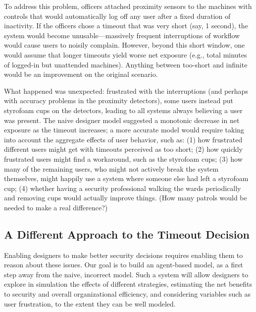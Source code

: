 \documentclass{acm_proc_article-sp}
\newcommand{\ignore}[1] {}
\begin{document}
\ignore{To address this problem, the officers attached proximity sensors to the machines and added controls that,
when detecting that a computer had been left unattended but logged-in for a predetermined, fixed, period of time, the user would be automatically logged off.}
To address this problem, officers attached proximity sensors to the machines 
with controls that would automatically log off any user after a fixed 
duration of inactivity.
If the officers chose a timeout that was very short (say, 1 second),
the system would become unusable---massively frequent interruptions of workflow would cause users to noisily complain.  
However, beyond this short window, one would assume that longer timeouts
yield worse net exposure (e.g., total minutes of logged-in but unattended machines).   Anything between too-short and infinite would be an improvement 
on the original scenario.

What happened was unexpected: frustrated with the interruptions (and
perhaps with accuracy problems in the proximity detectors), some users
instead put styrofoam cups on the detectors, leading to all systems
always believing a user was present.  The naive designer model
suggested a monotonic decrease in net exposure as the timeout
increases; a more
accurate model would require taking into account the aggregate effects
of user behavior, such as: (1) how frustrated different users might
get with timeouts perceived as too short; (2) how quickly frustrated
users might find a workaround, such as the styrofoam cups; (3) how
many of the remaining users, who might not actively break the system
themselves, might happily use a system where someone else had left a
styrofoam cup; (4) whether having a security professional walking the
wards periodically and removing cups would actually improve things.
(How many patrols would be needed to make a real difference?)

\subsection{A Different Approach to the Timeout Decision}

Enabling designers to make better security decisions requires enabling
them to reason about these issues.  Our goal is to build an
agent-based model, as a first step away from the naive, incorrect
model. Such a system will allow designers to explore in simulation the
effects of different strategies, estimating the net benefits to
security and overall organizational efficiency, and considering
variables such as user frustration, to the extent they can be well
modeled.
\end{document}
